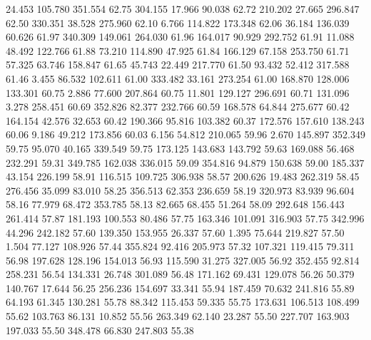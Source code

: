   24.453  105.780  351.554        62.75
 304.155   17.966   90.038        62.72
 210.202   27.665  296.847        62.50
 330.351   38.528  275.960        62.10
   6.766  114.822  173.348        62.06
  36.184  136.039   60.626        61.97
 340.309  149.061  264.030        61.96
 164.017   90.929  292.752        61.91
  11.088   48.492  122.766        61.88
  73.210  114.890   47.925        61.84
 166.129   67.158  253.750        61.71
  57.325   63.746  158.847        61.65
  45.743   22.449  217.770        61.50
  93.432   52.412  317.588        61.46
   3.455   86.532  102.611        61.00
 333.482   33.161  273.254        61.00
 168.870  128.006  133.301        60.75
   2.886   77.600  207.864        60.75
  11.801  129.127  296.691        60.71
 131.096    3.278  258.451        60.69
 352.826   82.377  232.766        60.59
 168.578   64.844  275.677        60.42
 164.154   42.576   32.653        60.42
 190.366   95.816  103.382        60.37
 172.576  157.610  138.243        60.06
   9.186   49.212  173.856        60.03
   6.156   54.812  210.065        59.96
   2.670  145.897  352.349        59.75
  95.070   40.165  339.549        59.75
 173.125  143.683  143.792        59.63
 169.088   56.468  232.291        59.31
 349.785  162.038  336.015        59.09
 354.816   94.879  150.638        59.00
 185.337   43.154  226.199        58.91
 116.515  109.725  306.938        58.57
 200.626   19.483  262.319        58.45
 276.456   35.099   83.010        58.25
 356.513   62.353  236.659        58.19
 320.973   83.939   96.604        58.16
  77.979   68.472  353.785        58.13
  82.665   68.455   51.264        58.09
 292.648  156.443  261.414        57.87
 181.193  100.553   80.486        57.75
 163.346  101.091  316.903        57.75
 342.996   44.296  242.182        57.60
 139.350  153.955   26.337        57.60
   1.395   75.644  219.827        57.50
   1.504   77.127  108.926        57.44
 355.824   92.416  205.973        57.32
 107.321  119.415   79.311        56.98
 197.628  128.196  154.013        56.93
 115.590   31.275  327.005        56.92
 352.455   92.814  258.231        56.54
 134.331   26.748  301.089        56.48
 171.162   69.431  129.078        56.26
  50.379  140.767   17.644        56.25
 256.236  154.697   33.341        55.94
 187.459   70.632  241.816        55.89
  64.193   61.345  130.281        55.78
  88.342  115.453   59.335        55.75
 173.631  106.513  108.499        55.62
 103.763   86.131   10.852        55.56
 263.349   62.140   23.287        55.50
 227.707  163.903  197.033        55.50
 348.478   66.830  247.803        55.38
